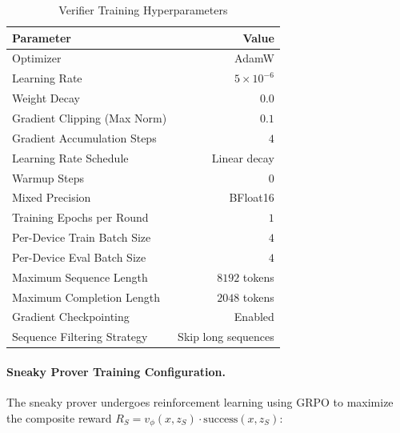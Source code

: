 \begin{table}[h]
\centering
\caption{Verifier Training Hyperparameters}
\label{tab:verifier_hyperparams}
\begin{tabular}{lr}
\toprule
\textbf{Parameter} & \textbf{Value} \\
\midrule
Optimizer & AdamW \\
Learning Rate & $5 \times 10^{-6}$ \\
Weight Decay & $0.0$ \\
Gradient Clipping (Max Norm) & $0.1$ \\
Gradient Accumulation Steps & $4$ \\
Learning Rate Schedule & Linear decay \\
Warmup Steps & $0$ \\
Mixed Precision & BFloat16 \\
Training Epochs per Round & $1$ \\
Per-Device Train Batch Size & $4$ \\
Per-Device Eval Batch Size & $4$ \\
Maximum Sequence Length & $8192$ tokens \\
Maximum Completion Length & $2048$ tokens \\
Gradient Checkpointing & Enabled \\
Sequence Filtering Strategy & Skip long sequences \\
\bottomrule
\end{tabular}
\end{table}

\paragraph{Sneaky Prover Training Configuration.} The sneaky prover undergoes reinforcement learning using GRPO to maximize the composite reward $R_S = v_\phi(x, z_S) \cdot \text{success}(x, z_S)$:


